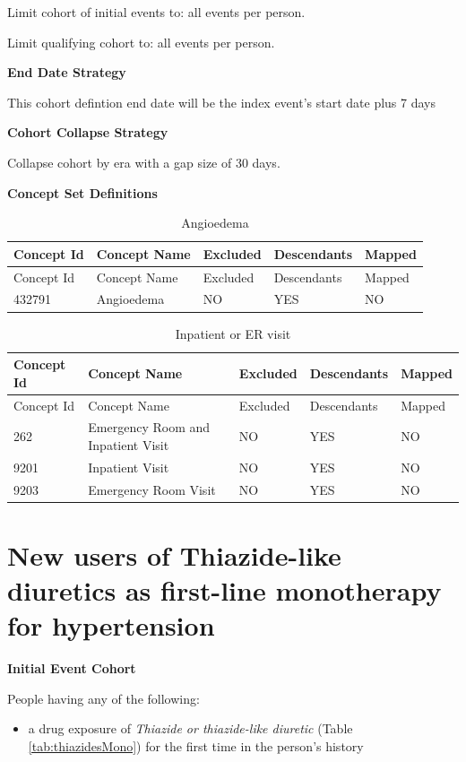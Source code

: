 \documentclass[11pt]{book}
\providecommand{\tightlist}{%
  \setlength{\itemsep}{0pt}\setlength{\parskip}{0pt}}
\theoremstyle{definition}
\theoremstyle{definition}
\theoremstyle{definition}
\theoremstyle{remark}
\begin{document}
Limit cohort of initial events to: all events per person.

Limit qualifying cohort to: all events per person.

\textbf{End Date Strategy}

This cohort defintion end date will be the index event's start date plus 7 days

\textbf{Cohort Collapse Strategy}

Collapse cohort by era with a gap size of 30 days.

\textbf{Concept Set Definitions}

\begin{longtable}[]{@{}lllll@{}}
\caption{\label{tab:angioedema} Angioedema}\tabularnewline
\toprule
Concept Id & Concept Name & Excluded & Descendants & Mapped\tabularnewline
\midrule
\endfirsthead
\toprule
Concept Id & Concept Name & Excluded & Descendants & Mapped\tabularnewline
\midrule
\endhead
432791 & Angioedema & NO & YES & NO\tabularnewline
\bottomrule
\end{longtable}

\begin{longtable}[]{@{}lllll@{}}
\caption{\label{tab:inpatientOrEr} Inpatient or ER visit}\tabularnewline
\toprule
Concept Id & Concept Name & Excluded & Descendants & Mapped\tabularnewline
\midrule
\endfirsthead
\toprule
Concept Id & Concept Name & Excluded & Descendants & Mapped\tabularnewline
\midrule
\endhead
262 & Emergency Room and Inpatient Visit & NO & YES & NO\tabularnewline
9201 & Inpatient Visit & NO & YES & NO\tabularnewline
9203 & Emergency Room Visit & NO & YES & NO\tabularnewline
\bottomrule
\end{longtable}

\hypertarget{ThiazidesMono}{%
\section{New users of Thiazide-like diuretics as first-line monotherapy for hypertension}\label{ThiazidesMono}}

\textbf{Initial Event Cohort}

People having any of the following:

\begin{itemize}
\tightlist
\item
  a drug exposure of \emph{Thiazide or thiazide-like diuretic} (Table \ref{tab:thiazidesMono}) for the first time in the person's history
\end{itemize}
\end{document}
